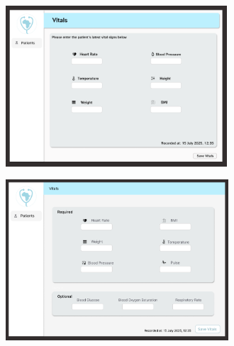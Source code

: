 \begin{figure}[H]\ContinuedFloat
  \par\smallskip
  \begin{subfigure}[t]{0.48\linewidth}
    \centering
    \includegraphics[height=6cm]{images03/3-2-2-figure4c.png}
    \caption{}
    \label{fig:vitals-v3}
  \end{subfigure}\hfill
  \begin{subfigure}[t]{0.48\linewidth}
    \centering
    \includegraphics[height=6cm]{images03/3-2-2-figure4d.png}
    \caption{}
    \label{fig:vitals-v4}
  \end{subfigure}
\end{figure}
